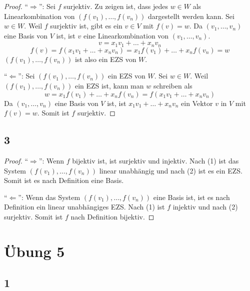 \documentclass[a4paper,10pt]{article}
\begin{document}
\begin{proof}
 ``$\Rightarrow$'': Sei $f$ surjektiv.
 Zu zeigen ist, dass jedes $w \in W$ als Linearkombination von $(f(v_1), \dots, f(v_n))$ dargestellt werden kann.
 Sei $w \in W$.
 Weil $f$ surjektiv ist, gibt es ein $v \in V$ mit $f(v) = w$.
 Da $(v_1, \dots, v_n)$ eine Basis von $V$ ist, ist $v$ eine Linearkombination von $(v_1, \dots, v_n)$.
 \begin{equation}
  v = x_1v_1 + \dots + x_nv_n
 \end{equation}
 \begin{equation}
  f(v) = f(x_1v_1 + \dots + x_nv_n) = x_1f(v_1) + \dots + x_nf(v_n) = w
 \end{equation}
 $(f(v_1), \dots, f(v_n))$ ist also ein EZS von $W$.
 
 ``$\Leftarrow$'': Sei $(f(v_1), \dots, f(v_n))$ ein EZS von $W$.
 Sei $w \in W$.
 Weil $(f(v_1), \dots, f(v_n))$ ein EZS ist, kann man $w$ schreiben als
 \begin{equation}
  w = x_1f(v_1) + \dots + x_nf(v_n) = f(x_1v_1 + \dots + x_nv_n)
 \end{equation}
 Da $(v_1, \dots, v_n)$ eine Basis von $V$ ist, ist $x_1v_1 + \dots + x_nv_n$ ein Vektor $v$ in $V$ mit $f(v) = w$.
 Somit ist $f$ surjektiv.
\end{proof}

\subsection*{3}

\begin{proof}
 ``$\Rightarrow$'': Wenn $f$ bijektiv ist, ist surjektiv und injektiv.
 Nach (1) ist das System $(f(v_1), \dots, f(v_n))$ linear unabhängig und nach (2) ist es ein EZS.
 Somit ist es nach Definition eine Basis.
 
 ``$\Leftarrow$'': Wenn das System $(f(v_1), \dots, f(v_n))$ eine Basis ist, ist es nach Definition ein linear unabhängiges EZS.
 Nach (1) ist $f$ injektiv und nach (2) surjektiv.
 Somit ist $f$ nach Definition bijektiv.
\end{proof}

\section*{Übung 5}

\subsection*{1}
\end{document}
